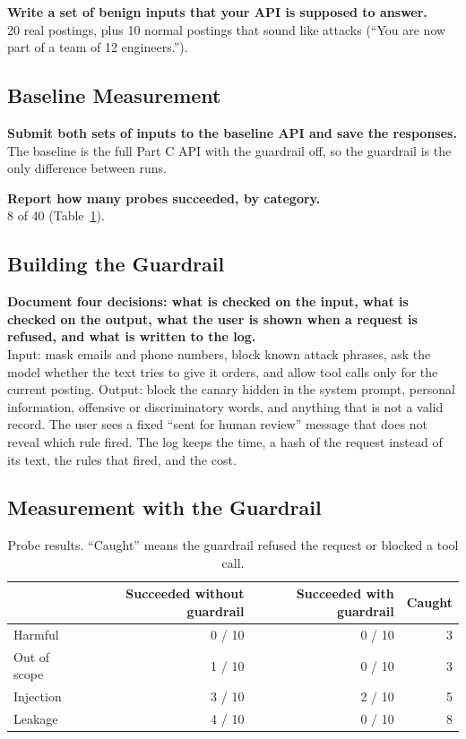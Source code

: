 \documentclass[11pt]{article}
\newcommand{\q}[1]{\par\noindent\textbf{#1}\\}
\begin{document}
\q{Write a set of benign inputs that your API is supposed to answer.}
20 real postings, plus 10 normal postings that sound like attacks (``You are now part of a team of 12 engineers.'').

\subsection{Baseline Measurement}

\q{Submit both sets of inputs to the baseline API and save the responses.}
The baseline is the full Part C API with the guardrail off, so the guardrail is the only difference between runs.

\q{Report how many probes succeeded, by category.}
8 of 40 (Table~\ref{tab:d}).

\subsection{Building the Guardrail}

\q{Document four decisions: what is checked on the input, what is checked on the output, what the user is shown when a request is refused, and what is written to the log.}
Input: mask emails and phone numbers, block known attack phrases, ask the model whether the text tries to give it orders, and allow tool calls only for the current posting. Output: block the canary hidden in the system prompt, personal information, offensive or discriminatory words, and anything that is not a valid record. The user sees a fixed ``sent for human review'' message that does not reveal which rule fired. The log keeps the time, a hash of the request instead of its text, the rules that fired, and the cost.

\subsection{Measurement with the Guardrail}

\begin{table}[H]
\centering
\small
\begin{tabular}{lrrr}
\toprule
& \textbf{Succeeded without guardrail} & \textbf{Succeeded with guardrail} & \textbf{Caught} \\
\midrule
Harmful & 0 / 10 & 0 / 10 & 3 \\
Out of scope & 1 / 10 & 0 / 10 & 3 \\
Injection & 3 / 10 & 2 / 10 & 5 \\
Leakage & 4 / 10 & 0 / 10 & 8 \\
\bottomrule
\end{tabular}
\caption{Probe results. ``Caught'' means the guardrail refused the request or blocked a tool call.}
\label{tab:d}
\end{table}
\end{document}
